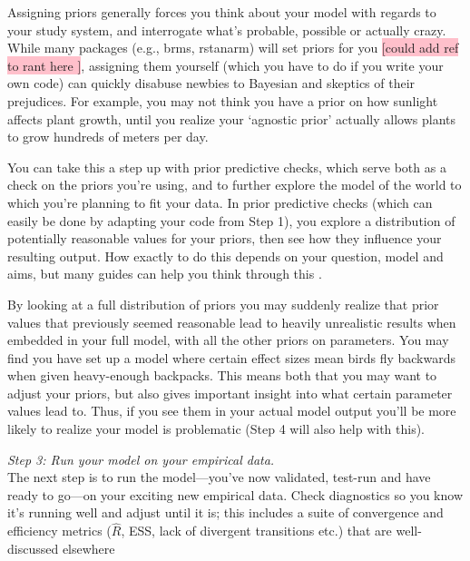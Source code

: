 \documentclass[11pt]{article}
\begin{document}
{Assigning priors generally forces you think about your model with regards to your study system, and interrogate what's probable, possible or actually crazy. While many packages (e.g., \textsf{brms, rstanarm}) will set priors for you \colorbox{pink}{[could add ref to rant here ]}, assigning them yourself (which you have to do if you write your own code) can quickly disabuse newbies to Bayesian and skeptics of their prejudices. For example, you may not think you have a prior on how sunlight affects plant growth, until you realize your `agnostic prior' actually allows plants to grow hundreds of meters per day. %

You can take this a step up with prior predictive checks, which serve both as a check on the priors you're using, and to further explore the model of the world to which you're planning to fit your data. In prior predictive checks (which can easily be done by adapting your code from Step 1), you explore a distribution of potentially reasonable values for your priors, then see how they influence your resulting output. How exactly to do this depends on your question, model and aims, but many guides can help you think through this \citep{betanprior,wesner2021,winter2023}. 

By looking at a full distribution of priors you may suddenly realize that prior values that previously seemed reasonable lead to heavily unrealistic results when embedded in your full model, with all the other priors on parameters. You may find you have set up a model where certain effect sizes mean birds fly backwards when given heavy-enough backpacks. This means both that you may want to adjust your priors, but also gives important insight into what certain parameter values lead to. Thus, if you see them in your actual model output you'll be more likely to realize your model is problematic (Step 4 will also help with this).

 \emph{Step 3: Run your model on your empirical data.} \\
The next step is to run the model---you've now validated, test-run and have ready to go---on your exciting new empirical data. Check diagnostics so you know it's running well and adjust until it is; this includes a suite of convergence and efficiency metrics ($\hat{R}$, ESS, lack of divergent transitions etc.) that are well-discussed elsewhere \citep[and not our focus here, see instead][]{betanworkflow,gelman2020bayesian,vandeschoot2021,gabryvis}
 
}
\end{document}
